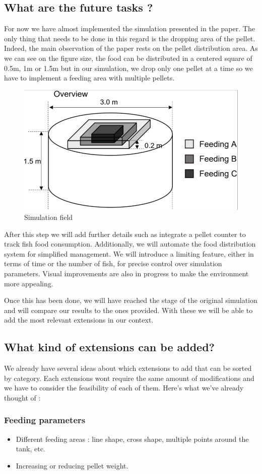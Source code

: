 \documentclass[9pt]{article}
\begin{document}
\subsection{What are the future tasks ?}
For now we have almost implemented the simulation presented in the paper. The only thing that needs to be done in this regard is the dropping area of the pellet. Indeed, the main observation of the paper rests on the pellet distribution area. As we can see on the figure size, the food can be distributed in a centered square of 0.5m, 1m or 1.5m but in our simulation, we drop only one pellet at a time so we have to implement a feeding area with multiple pellets. 

\begin{figure}
    \centering
    \includegraphics[width=0.3\linewidth]{fig5.png}
    \caption{Simulation field}
    \label{fig:enter-label}
\end{figure}

After this step we will add further details such as integrate a pellet counter to track fish food consumption. Additionally, we will automate the food distribution system for simplified management. We will introduce a limiting feature, either in terms of time or the number of fish, for precise control over simulation parameters. Visual improvements are also in progress to make the environment more appealing.

Once this has been done, we will have reached the stage of the original simulation and will compare our results to the ones provided. With these we will be able to add the most relevant extensions in our context.


\subsection{What kind of extensions can be added?}
We already have several ideas about which extensions to add that can be sorted by category. Each extensions wont require the same amount of modifications and we have to consider the feasibility of each of them. Here's what we've already thought of :

\small\subsubsection*{Feeding parameters}
\begin{itemize}
    \item Different feeding areas : line shape, cross shape, multiple points around the tank, etc.
    \item Increasing or reducing pellet weight.
\end{itemize}
\end{document}

